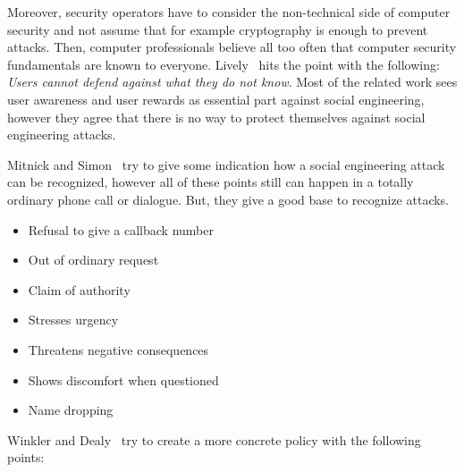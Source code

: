 Moreover, security operators have to consider the non-technical side of
computer security and not assume that for example cryptography is enough to
prevent attacks. Then, computer professionals believe all too often that
computer security fundamentals are known to everyone. Lively~\cite{lively2003} hits
the point with the following: \textit{\glqq{}Users cannot defend against what
they do not know\grqq{}}. Most of the related work sees user awareness and user
rewards as essential part against social engineering, however they agree that
there is no way to protect themselves against social engineering attacks.

Mitnick and Simon~\cite{mitnick2003} try to give some indication how a social
engineering attack can be recognized, however all of these points still can
happen in a totally ordinary phone call or dialogue. But, they give a good
base to recognize attacks.

\begin{itemize}
  \item Refusal to give a callback number
  \item Out of ordinary request
  \item Claim of authority
  \item Stresses urgency
  \item Threatens negative consequences
  \item Shows discomfort when questioned
  \item Name dropping
\end{itemize}

Winkler and Dealy~\cite{winkler1995} try to create a more concrete policy with
the following points:

